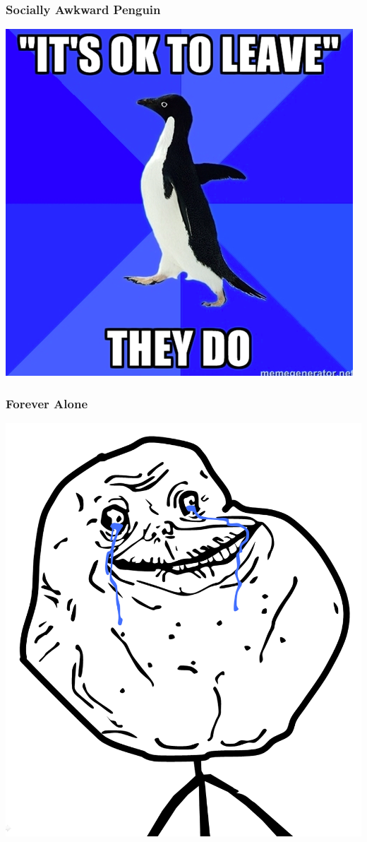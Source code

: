 \documentclass[slidestop,compress,mathserif,notes]{beamer}
\begin{document}
\begin{frame}
	\frametitle{Socially Awkward Penguin}
	\begin{center}
		\includegraphics[scale=0.3]{img/sap.png}			
	\end{center}	
\end{frame}

\begin{frame}
	\frametitle{Forever Alone}
	\begin{center}
		\includegraphics[scale=0.25]{img/forever_alone.png}
	\end{center}
\end{frame}
\end{document}
